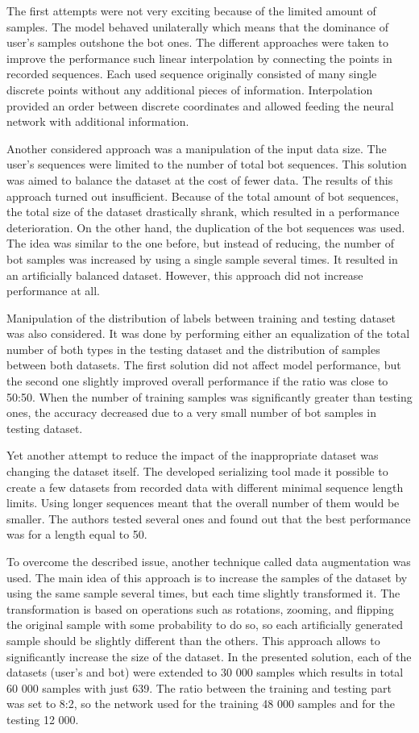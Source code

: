 The first attempts were not very exciting because of the limited amount of samples.
The model behaved unilaterally which means that the dominance of user's samples outshone the bot ones.
The different approaches were taken to improve the performance such linear interpolation by connecting the points in recorded sequences.
Each used sequence originally consisted of many single discrete points without any additional pieces of information.
Interpolation provided an order between discrete coordinates and allowed feeding the neural network with additional information.

Another considered approach was a manipulation of the input data size.
The user's sequences were limited to the number of total bot sequences.
This solution was aimed to balance the dataset at the cost of fewer data.
The results of this approach turned out insufficient.
Because of the total amount of bot sequences, the total size of the dataset drastically shrank, which resulted in a performance deterioration.
On the other hand, the duplication of the bot sequences was used.
The idea was similar to the one before, but instead of reducing, the number of bot samples was increased by using a single sample several times.
It resulted in an artificially balanced dataset.
However, this approach did not increase performance at all.

Manipulation of the distribution of labels between training and testing dataset was also considered.
It was done by performing either an equalization of the total number of both types in the testing dataset and the distribution of samples between both datasets.
The first solution did not affect model performance, but the second one slightly improved overall performance if the ratio was close to 50:50.
When the number of training samples was significantly greater than testing ones, the accuracy decreased due to a very small number of bot samples in testing dataset.

Yet another attempt to reduce the impact of the inappropriate dataset was changing the dataset itself.
The developed serializing tool made it possible to create a few datasets from recorded data with different minimal sequence length limits.
Using longer sequences meant that the overall number of them would be smaller.
The authors tested several ones and found out that the best performance was for a length equal to 50.

To overcome the described issue, another technique called data augmentation was used.
The main idea of this approach is to increase the samples of the dataset by using the same sample several times, but each time slightly transformed it.
The transformation is based on operations such as rotations, zooming, and flipping the original sample with some probability to do so, so each artificially generated sample should be slightly different than the others.
This approach allows to significantly increase the size of the dataset.
In the presented solution, each of the datasets (user's and bot) were extended to 30 000 samples which results in total 60 000 samples with just 639.
The ratio between the training and testing part was set to 8:2, so the network used for the training 48 000 samples and for the testing 12 000.

